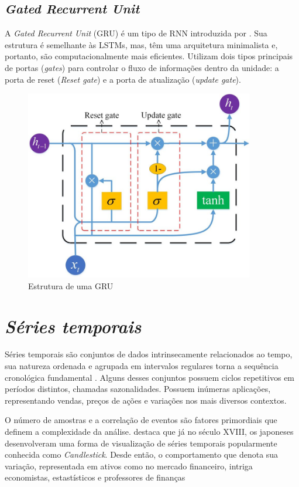 \subsection{\textit{Gated Recurrent Unit}} \label{sec:gru}
A \textit{Gated Recurrent Unit} (GRU) é um tipo de RNN introduzida por \textcite{Cho}.
Sua estrutura é semelhante às LSTMs, mas, têm uma arquitetura minimalista e, portanto, são computacionalmente mais eficientes. 
Utilizam dois tipos principais de portas (\textit{gates}) para controlar o fluxo de informações dentro da unidade: a porta de reset (\textit{Reset gate}) e a porta de atualização (\textit{update gate}).

\begin{figure}[!htb] \centering
  \caption{Estrutura de uma GRU} \label{figura:gru}
  \begin{varwidth}{\linewidth}
    \includegraphics[width=10cm]{figuras/gru.png}
  \end{varwidth}
\end{figure}

\section{\textit{Séries temporais}} \label{sec:temp}
Séries temporais são conjuntos de dados intrinsecamente relacionados ao tempo, sua natureza ordenada e agrupada em intervalos regulares
torna a sequência cronológica fundamental \cite{Esling}. Alguns desses conjuntos possuem ciclos repetitivos em períodos distintos, chamadas sazonalidades. 
Possuem inúmeras aplicações, representando vendas, preços de ações e variações nos mais diversos contextos.

O número de amostras e a correlação de eventos são fatores primordiais que definem a complexidade da análise.
\textcite{Nison} destaca que já no século XVIII, os japoneses desenvolveram uma forma de
visualização de séries temporais popularmente conhecida como \textit{Candlestick}.
Desde então, o comportamento que denota sua variação, representada em ativos como no mercado financeiro, intriga economistas, estastísticos e professores de finanças \cite{Fama}

